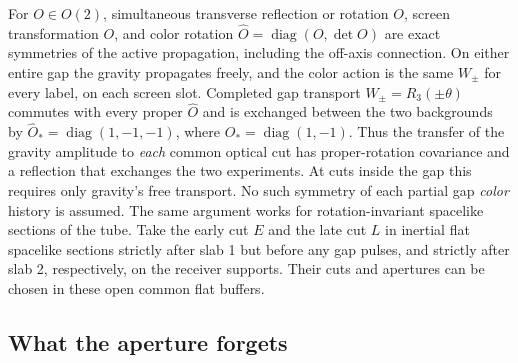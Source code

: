 \documentclass[11pt]{article}
\begin{document}
For \(O\in O(2)\), simultaneous transverse reflection or
rotation \(O\), screen transformation \(O\), and color
rotation \(\widehat O=\operatorname{diag}(O,\det O)\)
are exact symmetries of the active propagation, including
the off-axis connection. On either entire gap the gravity
propagates freely, and the color action is the same
\(W_\pm\) for every label, on each screen slot. Completed
gap transport \(W_\pm=R_3(\pm\theta)\) commutes with every
proper \(\widehat O\) and is exchanged between the two
backgrounds by
\(\widehat O_*=\operatorname{diag}(1,-1,-1)\),
where \(O_*=\operatorname{diag}(1,-1)\).
Thus the transfer of the gravity amplitude to \emph{each}
common optical cut has proper-rotation covariance and a
reflection that exchanges the two experiments. At cuts
inside the gap this requires only gravity's free transport.
No such symmetry of each partial gap \emph{color} history
is assumed. The same argument works for rotation-invariant
spacelike sections of the tube. Take the early cut \(E\)
and the late cut \(L\) in inertial flat spacelike sections
strictly after slab 1 but before any gap pulses, and
strictly after slab 2, respectively, on the receiver
supports. Their cuts and apertures can be chosen in these
open common flat buffers.

\subsection{What the aperture forgets}
\end{document}
